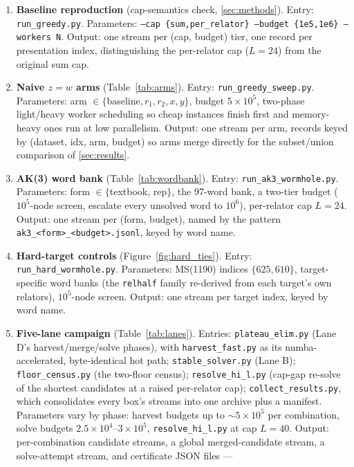 \begin{enumerate}
  \item \textbf{Baseline reproduction} (cap-semantics check, \ref{sec:methods}). Entry:
    \texttt{run\_greedy.py}. Parameters: \texttt{--cap \{sum,per\_relator\} --budget
    \{1e5,1e6\} --workers N}. Output: one stream per (cap, budget) tier, one record per
    presentation index, distinguishing the per-relator cap ($L=24$) from the original sum
    cap.
  \item \textbf{Naive $z=w$ arms} (Table~\ref{tab:arms}). Entry:
    \texttt{run\_greedy\_sweep.py}. Parameters: arm $\in\{$baseline$,r_1,r_2,x,y\}$, budget
    $5\times10^5$, two-phase light/heavy worker scheduling so cheap instances finish first
    and memory-heavy ones run at low parallelism. Output: one stream per arm, records keyed
    by (dataset, idx, arm, budget) so arms merge directly for the subset/union comparison
    of \ref{sec:results}.
  \item \textbf{AK(3) word bank} (Table~\ref{tab:wordbank}). Entry:
    \texttt{run\_ak3\_wormhole.py}. Parameters: form $\in\{$textbook, rep$\}$, the 97-word
    bank, a two-tier budget ($10^5$-node screen, escalate every unsolved word to $10^6$),
    per-relator cap $L=24$. Output: one stream per (form, budget), named by the pattern
    \texttt{ak3\_<form>\_<budget>.jsonl}, keyed by word name.
  \item \textbf{Hard-target controls} (Figure~\ref{fig:hard_ties}). Entry:
    \texttt{run\_hard\_wormhole.py}. Parameters: MS(1190) indices $\{625,610\}$,
    target-specific word banks (the \texttt{relhalf} family re-derived from each target's
    own relators), $10^5$-node screen. Output: one stream per target index, keyed by word
    name.
  \item \textbf{Five-lane campaign} (Table~\ref{tab:lanes}). Entries:
    \texttt{plateau\_elim.py} (Lane D's harvest/merge/solve phases), with
    \texttt{harvest\_fast.py} as its numba-accelerated, byte-identical hot path;
    \texttt{stable\_solver.py} (Lane B); \texttt{floor\_census.py} (the two-floor census);
    \texttt{resolve\_hi\_l.py} (cap-gap re-solve of the shortest candidates at a raised
    per-relator cap); \texttt{collect\_results.py}, which consolidates every box's streams
    into one archive plus a manifest. Parameters vary by phase: harvest budgets up to
    $\sim\!5\times10^5$ per combination, solve budgets $2.5\times10^4$--$3\times10^5$,
    \texttt{resolve\_hi\_l.py} at cap $L=40$. Output: per-combination candidate streams, a
    global merged-candidate stream, a solve-attempt stream, and certificate JSON files ---

\end{enumerate}
